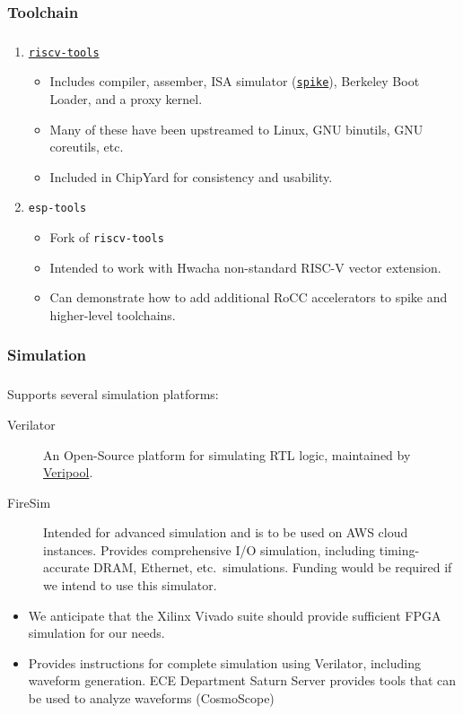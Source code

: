 \documentclass{weeklyslides}
\begin{document}
\subsubsection{Toolchain}\label{subsubsec:Toolchain} %
\begin{frame}
  \frametitle{}
  \begin{enumerate}
  \item \href{https://github.com/riscv/riscv-tools}{\texttt{riscv-tools}}
    \begin{itemize}
    \item Includes compiler, assember, ISA simulator (\href{https://github.com/riscv/riscv-isa-sim}{\texttt{spike}}), Berkeley Boot Loader, and a proxy kernel.
    \item Many of these have been upstreamed to Linux, GNU binutils, GNU coreutils, etc.
    \item Included in ChipYard for consistency and usability.
    \end{itemize}
  \item \texttt{esp-tools}
    \begin{itemize}
    \item Fork of \texttt{riscv-tools}
    \item Intended to work with Hwacha non-standard RISC-V vector extension.
    \item Can demonstrate how to add additional RoCC accelerators to spike and higher-level toolchains.
    \end{itemize}
  \end{enumerate}
\end{frame}

\subsubsection{Simulation}\label{subsubsec:Simulation}
\begin{frame}
  \frametitle{}
  Supports several simulation platforms:
  \begin{description}
  \item[Verilator] An Open-Source platform for simulating RTL logic, maintained by \href{https://www.veripool.org/}{Veripool}.
  \item[FireSim] Intended for advanced simulation and is to be used on AWS cloud instances.
    Provides comprehensive I/O simulation, including timing-accurate DRAM, Ethernet, etc.\ simulations.
    Funding would be required if we intend to use this simulator.
  \end{description}
  \begin{itemize}
  \item We anticipate that the Xilinx Vivado suite should provide sufficient FPGA simulation for our needs.
  \item Provides instructions for complete simulation using Verilator, including waveform generation. ECE Department Saturn Server provides tools that can be used to analyze waveforms (CosmoScope)
  \end{itemize}
\end{frame}
\end{document}
